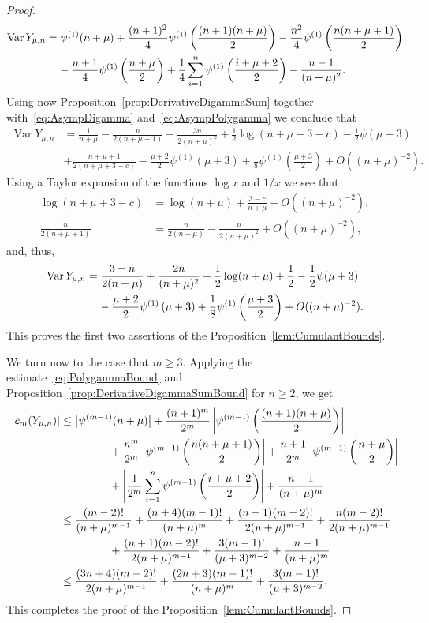 \documentclass[10pt]{amsart}
\theoremstyle{definition}\newtheorem{defi}[theo]{Definition}\newtheorem{rema}[theo]{Remark}\newtheorem{exam}[theo]{Example}\newtheorem{exem}[theo]{Example}\newtheorem{nota}[theo]{Notation}
\newcommand{\Var}{\mathop{\mathrm{Var}}\nolimits}
\begin{document}
\begin{proof}
\begin{align*}
\Var Y_{\mu,n}&=\psi^{(1)}(n+\mu)+\frac{(n+1)^2}{4}\psi^{(1)}\left(\frac{(n+1)(n+\mu)}{2}\right)-\frac{n^2}{4}\psi^{(1)}\left(\frac{n(n+\mu+1)}{2}\right)\\
&\mkern20mu -\frac{n+1}{4}\psi^{(1)}\left(\frac{n+\mu}{2}\right)+\frac{1}{4}\sum\limits_{i=1}^n\psi^{(1)}\left(\frac{i+\mu+2}{2}\right)-\frac{n-1}{(n+\mu)^2}.
\end{align*}
Using now Proposition~\ref{prop:DerivativeDigammaSum} together with~\eqref{eq:AsympDigamma} and~\eqref{eq:AsympPolygamma} we conclude that
\begin{align*}
\Var Y_{\mu,n}&=\frac{1}{n+\mu}-\frac{n}{2(n+\mu+1)}+\frac{3n}{2(n+\mu)^2}+\frac12\log(n+\mu+3-c)-\frac12\psi(\mu+3)\\
&+\frac{n+\mu+1}{2(n+\mu+3-c)}-\frac{\mu+2}{2}\psi^{(1)}(\mu+3)+\frac{1}{8}\psi^{(1)}\left(\frac{\mu+3}{2}\right)+O\left((n+\mu)^{-2}\right).
\end{align*}
Using a Taylor expansion of the functions $\log x$ and $1/x$ we see that
\begin{align*}
\log(n+\mu+3-c)&=\log (n+\mu)+\frac{3-c}{n+\mu}+O\left((n+\mu)^{-2}\right),\\
\frac{n}{2(n+\mu+1)}&=\frac{n}{2(n+\mu)}-\frac{n}{2(n+\mu)^2}+O\left((n+\mu)^{-2}\right),
\end{align*}
and, thus,
\begin{align*}
\Var Y_{\mu,n}&=\frac{3-n}{2(n+\mu)}+\frac{2n}{(n+\mu)^2}+\frac12\log(n+\mu)+\frac{1}{2}-\frac12\psi(\mu+3)\\
&\mkern20mu -\frac{\mu+2}{2}\psi^{(1)}\left(\mu+3\right)+\frac{1}{8}\psi^{(1)}\left(\frac{\mu+3}{2}\right)+O((n+\mu)^{-2}).
\end{align*}
This proves the first two assertions of the Proposition~\ref{lem:CumulantBounds}.

We turn now to the case that $m\geq 3$. Applying the estimate~\eqref{eq:PolygammaBound} and Proposition~\ref{prop:DerivativeDigammaSumBound} for $n\ge 2$, we get
\begin{align*}
|c_m(Y_{\mu,n})|&\leq\big|\psi^{(m-1)}(n+\mu)\big|+\frac{(n+1)^m}{2^m}\left|\psi^{(m-1)}\left(\frac{(n+1)(n+\mu)}{2}\right)\right|\\
&\mkern80mu+\frac{n^m}{2^m}\left|\psi^{(m-1)}\left(\frac{n(n+\mu+1)}{2}\right)\right|+\frac{n+1}{2^m}\left|\psi^{(m-1)}\left(\frac{n+\mu}{2}\right)\right|\\
&\mkern80mu+\left|\frac{1}{2^m}\sum\limits_{i=1}^n\psi^{(m-1)}\left(\frac{i+\mu+2}{2}\right)\right|+\frac{n-1}{(n+\mu)^m}\\
&\leq\frac{(m-2)!}{(n+\mu)^{m-1}}+\frac{(n+4)(m-1)!}{(n+\mu)^{m}}+\frac{(n+1)(m-2)!}{2(n+\mu)^{m-1}}+\frac{n(m-2)!}{2(n+\mu)^{m-1}}\\
&\mkern80mu+\frac{(n+1)(m-2)!}{2(n+\mu)^{m-1}}+\frac{3(m-1)!}{(\mu+3)^{m-2}}+\frac{n-1}{(n+\mu)^m}\\
&\leq\frac{(3n+4)(m-2)!}{2(n+\mu)^{m-1}}+\frac{(2n+3)(m-1)!}{(n+\mu)^{m}}+\frac{3(m-1)!}{(\mu+3)^{m-2}}.
\end{align*}
This completes the proof of the Proposition~\ref{lem:CumulantBounds}.
\end{proof}
\end{document}
